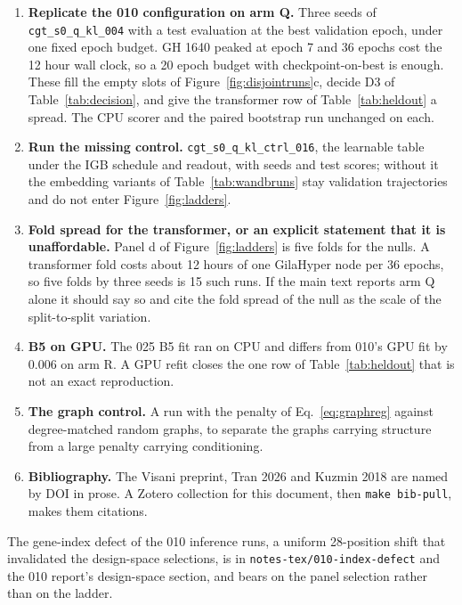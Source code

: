 \begin{enumerate}
\item \textbf{Replicate the 010 configuration on arm Q.} Three seeds of
  \texttt{cgt\_s0\_q\_kl\_004} with a test evaluation at the best validation epoch,
  under one fixed epoch budget. GH 1640 peaked at epoch 7 and 36 epochs cost the 12
  hour wall clock, so a 20 epoch budget with checkpoint-on-best is enough. These
  fill the empty slots of Figure~\ref{fig:disjointruns}c, decide D3 of
  Table~\ref{tab:decision}, and give the transformer row of
  Table~\ref{tab:heldout} a spread. The CPU scorer and the paired bootstrap run
  unchanged on each.
\item \textbf{Run the missing control.} \texttt{cgt\_s0\_q\_kl\_ctrl\_016}, the
  learnable table under the IGB schedule and readout, with seeds and test scores;
  without it the embedding variants of Table~\ref{tab:wandbruns} stay validation
  trajectories and do not enter Figure~\ref{fig:ladders}.
\item \textbf{Fold spread for the transformer, or an explicit statement that it is
  unaffordable.} Panel d of Figure~\ref{fig:ladders} is five folds for the nulls. A
  transformer fold costs about 12 hours of one GilaHyper node per 36 epochs, so five
  folds by three seeds is 15 such runs. If the main text reports arm Q alone it
  should say so and cite the fold spread of the null as the scale of the
  split-to-split variation.
\item \textbf{B5 on GPU.} The 025 B5 fit ran on CPU and differs from 010's GPU fit
  by 0.006 on arm R. A GPU refit closes the one row of Table~\ref{tab:heldout} that
  is not an exact reproduction.
\iflong
\item \textbf{The graph control.} A run with the penalty of Eq.~\ref{eq:graphreg}
  against degree-matched random graphs, to separate the graphs carrying structure
  from a large penalty carrying conditioning.
\fi
\item \textbf{Bibliography.} The Visani preprint, Tran 2026 and Kuzmin 2018 are
  named by DOI in prose. A Zotero collection for this document, then
  \texttt{make bib-pull}, makes them citations.
\end{enumerate}

\iflong
{}
The gene-index defect of the 010 inference runs, a uniform 28-position shift that
invalidated the design-space selections, is in \texttt{notes-tex/010-index-defect}
and the 010 report's design-space section, and bears on the panel selection rather
than on the ladder.
\fi
